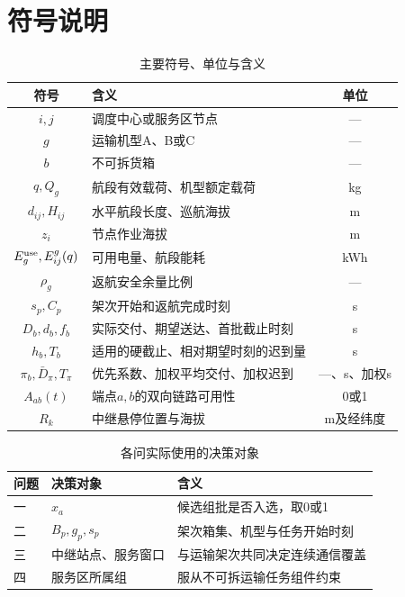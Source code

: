 \section{符号说明}

\begin{table}[H]\centering\small
\caption{主要符号、单位与含义}\label{tab:symbols}
\begin{tabular}{clc}\toprule
符号 & 含义 & 单位\\\midrule
$i,j$ & 调度中心或服务区节点 & ---\\
$g$ & 运输机型A、B或C & ---\\
$b$ & 不可拆货箱 & ---\\
$q,Q_g$ & 航段有效载荷、机型额定载荷 & kg\\
$d_{ij},H_{ij}$ & 水平航段长度、巡航海拔 & m\\
$z_i$ & 节点作业海拔 & m\\
$E_g^{\rm use},E_{ij}^g(q)$ & 可用电量、航段能耗 & kWh\\
$\rho_g$ & 返航安全余量比例 & ---\\
$s_p,C_p$ & 架次开始和返航完成时刻 & s\\
$D_b,d_b,f_b$ & 实际交付、期望送达、首批截止时刻 & s\\
$h_b,T_b$ & 适用的硬截止、相对期望时刻的迟到量 & s\\
$\pi_b,\bar D_\pi,T_\pi$ & 优先系数、加权平均交付、加权迟到 & ---、s、加权s\\
$A_{ab}(t)$ & 端点$a,b$的双向链路可用性 & 0或1\\
$R_k$ & 中继悬停位置与海拔 & m及经纬度\\
\bottomrule\end{tabular}
\end{table}

\begin{table}[H]\centering\small
\caption{各问实际使用的决策对象}\label{tab:decisions}
\begin{tabular}{lll}\toprule
问题 & 决策对象 & 含义\\\midrule
一 & $x_a$ & 候选组批是否入选，取0或1\\
二 & $B_p,g_p,s_p$ & 架次箱集、机型与任务开始时刻\\
三 & 中继站点、服务窗口 & 与运输架次共同决定连续通信覆盖\\
四 & 服务区所属组 & 服从不可拆运输任务组件约束\\\bottomrule
\end{tabular}\end{table}
